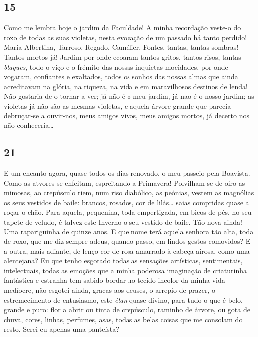 \subsection{15} 

Como me lembra hoje o jardim da Faculdade!
A minha recordação veste-o do roxo de todas as suas
violetas, nesta evocação de um passado há tanto 
perdido! Maria Albertina, Tarroso, Regado, Camélier,
Fontes, tantas, tantas sombras! Tantos mortos já! 
Jardim por onde ecoaram tantos gritos, tantos risos, tantas
\textit{blagues}, todo o viço e o frémito das nossas inquietas
mocidades, por onde vogaram, confiantes e exaltados,
todos os sonhos das nossas almas que ainda 
acreditavam na glória, na riqueza, na vida e em maravilhosos
destinos de lenda! Não gostaria de o tornar a ver; já
não é o meu jardim, já nao é o nosso jardim; as 
violetas já não são as mesmas violetas, e aquela árvore
grande que parecia debruçar-se a ouvir-nos, meus 
amigos vivos, meus amigos mortos, já decerto nos não
conheceria\ldots

\subsection{21} 

E um encanto agora, quase todos os dias
renovado, o meu passeio pela Boavista. Como as
atvores se enfeitam, espreitando a Primavera! 
Polvilham-se de oiro as mimosas, ao crepúsculo riem, num
riso diabólico, as peónias, vestem as magnólias os
seus vestidos de baile: brancos, rosados, cor de lilás\ldots
saias compridas quase a roçar o chão. Para aquela,
pequenina, toda empertigada, em bicos de pés, no
seu tapete de veludo, é talvez este Inverno o seu
vestido de baile. Tão nova ainda! Uma rapariguinha de quinze anos. 
E que nome terá aquela 
senhora tão alta, toda de roxo, que me diz sempre adeus,
quando passo, em lindos gestos comovidos? E a outra,
mais adiante, de lenço cor-de-rosa amarrado à cabeça
airosa, como uma alentejana? Eu que tenho esgotado
todas as sensações artísticas, sentimentais, intelectuais,
todas as emoções que a minha poderosa imaginação
de criaturinha fantástica e estranha tem sabido bordar
no tecido incolor da minha vida medíocre, não esgotei
ainda, gracas aos deuses, o arrepio de prazer, o 
estremecimento de entusiasmo, este \textit{élan} quase divino,
para tudo o que é belo, grande e puro: flor a abrir ou
tinta de crepúsculo, raminho de árvore, ou gota de
chuva, cores, linhas, perfumes, asas, todas as belas
coisas que me consolam do resto. Serei eu apenas uma
panteísta?

